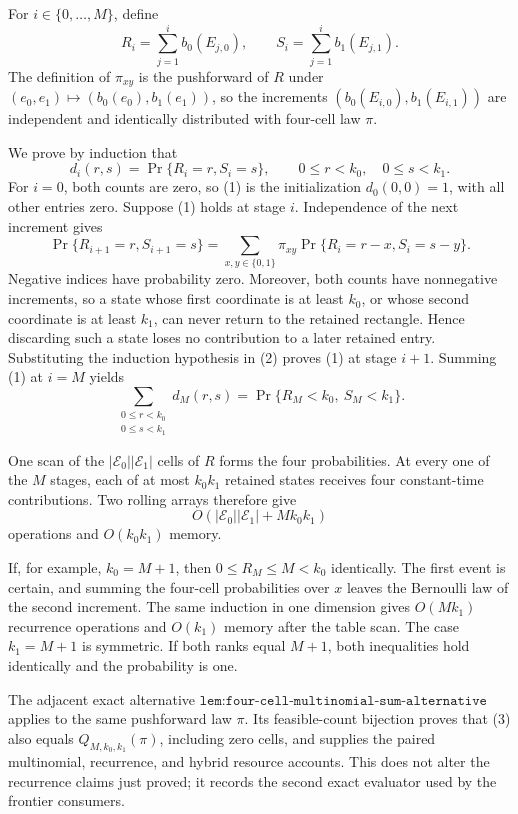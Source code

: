 For \(i\in\{0,\ldots,M\}\), define
\[
R_i=\sum_{j=1}^i b_0(E_{j,0}),\qquad S_i=\sum_{j=1}^i b_1(E_{j,1}).
\]
The definition of \(\pi_{xy}\) is the pushforward of \(R\) under \((e_0,e_1)\mapsto(b_0(e_0),b_1(e_1))\), so the increments \((b_0(E_{i,0}),b_1(E_{i,1}))\) are independent and identically distributed with four-cell law \(\pi\).

We prove by induction that
\[
d_i(r,s)=\Pr\{R_i=r,S_i=s\},\qquad 0\le r<k_0,\quad 0\le s<k_1. \tag{1}
\]
For \(i=0\), both counts are zero, so (1) is the initialization \(d_0(0,0)=1\), with all other entries zero.  Suppose (1) holds at stage \(i\).  Independence of the next increment gives
\[
\Pr\{R_{i+1}=r,S_{i+1}=s\}
=\sum_{x,y\in\{0,1\}}\pi_{xy}\Pr\{R_i=r-x,S_i=s-y\}. \tag{2}
\]
Negative indices have probability zero.  Moreover, both counts have nonnegative increments, so a state whose first coordinate is at least \(k_0\), or whose second coordinate is at least \(k_1\), can never return to the retained rectangle.  Hence discarding such a state loses no contribution to a later retained entry.  Substituting the induction hypothesis in (2) proves (1) at stage \(i+1\).  Summing (1) at \(i=M\) yields
\[
\sum_{\substack{0\le r<k_0\\0\le s<k_1}}d_M(r,s)
=\Pr\{R_M<k_0,\ S_M<k_1\}. \tag{3}
\]

One scan of the \(|\mathscr E_0||\mathscr E_1|\) cells of \(R\) forms the four probabilities.  At every one of the \(M\) stages, each of at most \(k_0k_1\) retained states receives four constant-time contributions.  Two rolling arrays therefore give
\[
O(|\mathscr E_0||\mathscr E_1|+Mk_0k_1)
\]
operations and \(O(k_0k_1)\) memory.

If, for example, \(k_0=M+1\), then \(0\le R_M\le M<k_0\) identically.  The first event is certain, and summing the four-cell probabilities over \(x\) leaves the Bernoulli law of the second increment.  The same induction in one dimension gives \(O(Mk_1)\) recurrence operations and \(O(k_1)\) memory after the table scan.  The case \(k_1=M+1\) is symmetric.  If both ranks equal \(M+1\), both inequalities hold identically and the probability is one.

The adjacent exact alternative \(\texttt{lem:four-cell-multinomial-sum-alternative}\) applies to the same pushforward law \(\pi\).  Its feasible-count bijection proves that (3) also equals \(Q_{M,k_0,k_1}(\pi)\), including zero cells, and supplies the paired multinomial, recurrence, and hybrid resource accounts.  This does not alter the recurrence claims just proved; it records the second exact evaluator used by the frontier consumers.
